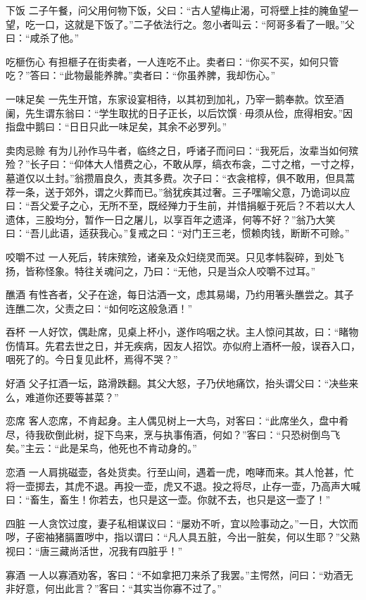 \documentclass[12pt,UTF8]{ctexbook}
\begin{document}
下饭
二子午餐，问父用何物下饭，父曰：“古人望梅止渴，可将壁上挂的腌鱼望一望，吃一口，这就是下饭了。”二子依法行之。忽小者叫云：“阿哥多看了一眼。”父曰：“咸杀了他。”

吃榧伤心
有担榧子在街卖者，一人连吃不止。卖者曰：“你买不买，如何只管吃？”答曰：“此物最能养脾。”卖者曰：“你虽养脾，我却伤心。”

一味足矣
一先生开馆，东家设宴相待，以其初到加礼，乃宰一鹅奉款。饮至酒阑，先生谓东翁曰：“学生取扰的日子正长，以后饮馔·毋须从俭，庶得相安。”因指盘中鹅曰：“日日只此一味足矣，其余不必罗列。”

卖肉忌赊
有为儿孙作马牛者，临终之日，呼诸子而问曰：“我死后，汝辈当如何殡殓？”长子曰：“仰体大人惜费之心，不敢从厚，缟衣布衾，二寸之棺，一寸之椁，墓道仅以土封。”翁攒眉良久，责其多费。次子曰：“衣衾棺椁，俱不敢用，但具蒿荐一条，送于郊外，谓之火葬而已。”翁犹疾其过奢。三子嘿喻父意，乃诡词以应曰：“吾父爱子之心，无所不至，既经殚力于生前，并惜捐躯于死后？不若以大人遗体，三股均分，暂作一日之屠儿，以享百年之遗泽，何等不好？”翁乃大笑曰：“吾儿此语，适获我心。”复戒之曰：“对门王三老，惯赖肉钱，断断不可赊。”

咬嚼不过
一人死后，转床殡殓，诸亲及众妇绕灵而哭。只见孝帏裂碎，到处飞扬，皆称怪象。特往关魂问之，乃曰：“无他，只是当众人咬嚼不过耳。”

醮酒
有性吝者，父子在途，每日沽酒一文，虑其易竭，乃约用箸头醮尝之。其子连醮二次，父责之曰：“如何吃这般急酒！”

吞杯
一人好饮，偶赴席，见桌上杯小，遂作呜咽之状。主人惊问其故，曰：“睹物伤情耳。先君去世之日，并无疾病，因友人招饮。亦似府上酒杯一般，误吞入口，咽死了的。今日复见此杯，焉得不哭？”

好酒
父子扛酒一坛，路滑跌翻。其父大怒，子乃伏地痛饮，抬头谓父曰：“决些来么，难道你还要等甚菜？”

恋席
客人恋席，不肯起身。主人偶见树上一大鸟，对客曰：“此席坐久，盘中肴尽，待我砍倒此树，捉下鸟来，烹与执事侑酒，何如？”客曰：“只恐树倒鸟飞矣。”主云：“此是呆鸟，他死也不肯动身的。”

恋酒
一人肩挑磁壶，各处货卖。行至山间，遇着一虎，咆哮而来。其人怆甚，忙将一壶掷去，其虎不退。再投一壶，虎又不退。投之将尽，止存一壶，乃高声大喊曰：“畜生，畜生！你若去，也只是这一壶。你就不去，也只是这一壶了！”

四脏
一人贪饮过度，妻子私相谋议曰：“屡劝不听，宜以险事动之。”一日，大饮而哕，子密袖猪膈置哕中，指以谓曰：“凡人具五脏，今出一脏矣，何以生耶？”父熟视曰：“唐三藏尚活世，况我有四脏乎！”

寡酒
一人以寡酒劝客，客曰：“不如拿把刀来杀了我罢。”主愕然，问曰：“劝酒无非好意，何出此言？”客曰：“其实当你寡不过了。”
\end{document}
